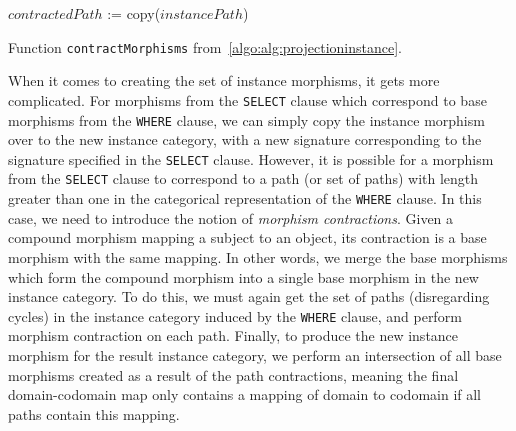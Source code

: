 \begin{algorithm}[ht]
\small
\DontPrintSemicolon
{}


$contractedPath$ := copy($instancePath$)



\caption{Function \texttt{contractMorphisms} from~\cref{algo:alg:projectioninstance}.}
\label{algo:alg:contractmorphisms}
\end{algorithm}

When it comes to creating the set of instance morphisms, it gets more complicated.
For morphisms from the \texttt{SELECT} clause which correspond to base morphisms from the \texttt{WHERE} clause, we can simply copy the instance morphism over to the new instance category, with a new signature corresponding to the signature specified in the \texttt{SELECT} clause.
However, it is possible for a morphism from the \texttt{SELECT} clause to correspond to a path (or set of paths) with length greater than one in the categorical representation of the \texttt{WHERE} clause.
In this case, we need to introduce the notion of \textit{morphism contractions}.
Given a compound morphism mapping a subject to an object, its contraction is a base morphism with the same mapping.
In other words, we merge the base morphisms which form the compound morphism into a single base morphism in the new instance category.
To do this, we must again get the set of paths (disregarding cycles) in the instance category induced by the \texttt{WHERE} clause, and perform morphism contraction on each path.
Finally, to produce the new instance morphism for the result instance category, we perform an intersection of all base morphisms created as a result of the path contractions, meaning the final domain-codomain map only contains a mapping of domain to codomain if all paths contain this mapping.

